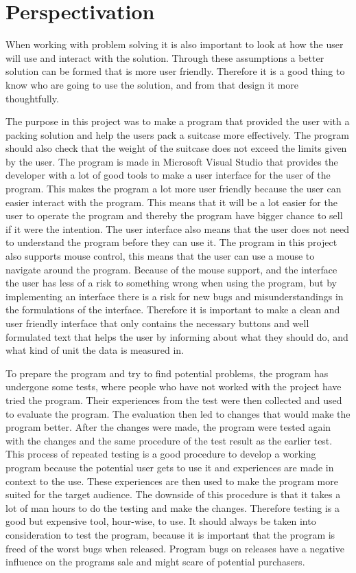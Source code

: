 \section{Perspectivation}
When working with problem solving it is also important to look at how the user will use and interact with the solution. Through these assumptions a better solution can be formed that is more user friendly. Therefore it is a good thing to know who are going to use the solution, and from that design it more thoughtfully.

The purpose in this project was to make a program that provided the user with a packing solution and help the users pack a suitcase more effectively. The program should also check that the weight of the suitcase does not exceed the limits given by the user. The program is made in Microsoft Visual Studio that provides the developer with a lot of good tools to make a user interface for the user of the program.
This makes the program a lot more user friendly because the user can easier interact with the program. This means that it will be a lot easier for the user to operate the program and thereby the program have bigger chance to sell if it were the intention.
The user interface also means that the user does not need to understand the program before they can use it.
The program in this project also supports mouse control, this means that the user can use a mouse to navigate around the program. Because of the mouse support, and the interface the user has less of a risk to something wrong when using the program, but by implementing an interface there is a risk for new bugs and misunderstandings in the formulations of the interface.
Therefore it is important to make a clean and user friendly interface that only contains the necessary buttons and well formulated text that helps the user by informing about what they should do, and what kind of unit the data is measured in.

To prepare the program and try to find potential problems, the program has undergone some tests, where people who have not worked with the project have tried the program. Their experiences from the test were then collected and used to evaluate the program. The evaluation then led to changes that would make the program better. After the changes were made, the program were tested again with the changes and the same procedure of the test result as the earlier test.
This process of repeated testing is a good procedure to develop a working program because the potential user gets to use it and experiences are made in context to the use. These experiences are then used to make the program more suited for the target audience. The downside of this procedure is that it takes a lot of man hours to do the testing and make the changes. Therefore testing is a good but expensive tool, hour-wise, to use.
It should always be taken into consideration to test the program, because it is important that the program is freed of the worst bugs when released. Program bugs on releases have a negative influence on the programs sale and might scare of potential purchasers.

